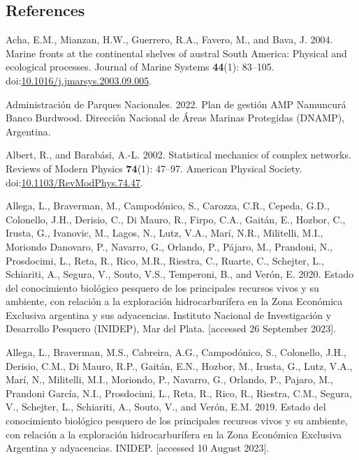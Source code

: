 \documentclass[
]{article}
\newlength{\cslhangindent}
\newenvironment{CSLReferences}[2] %
 {\begin{list}{}{%
  \setlength{\itemindent}{0pt}
  \setlength{\leftmargin}{0pt}
  \setlength{\parsep}{0pt}
  \ifodd #1
   \setlength{\leftmargin}{\cslhangindent}
   \setlength{\itemindent}{-1\cslhangindent}
  \fi
  \setlength{\itemsep}{#2\baselineskip}}}
 {\end{list}}
\begin{document}
\subsection*{References}\label{references}

\label{refs}
\begin{CSLReferences}{1}{0}
Acha, E.M., Mianzan, H.W., Guerrero, R.A., Favero, M., and Bava, J.
2004. Marine fronts at the continental shelves of austral {South
America}: {Physical} and ecological processes. Journal of Marine Systems
\textbf{44}(1): 83--105.
doi:\href{https://doi.org/10.1016/j.jmarsys.2003.09.005}{10.1016/j.jmarsys.2003.09.005}.

Administración de Parques Nacionales. 2022. {Plan de gesti{ó}n AMP
Namuncur{á} Banco Burdwood}. Direcci{ó}n Nacional de {Á}reas Marinas
Protegidas (DNAMP), Argentina.

Albert, R., and Barabási, A.-L. 2002. Statistical mechanics of complex
networks. Reviews of Modern Physics \textbf{74}(1): 47--97. American
Physical Society.
doi:\href{https://doi.org/10.1103/RevModPhys.74.47}{10.1103/RevModPhys.74.47}.

Allega, L., Braverman, M., Campodónico, S., Carozza, C.R., Cepeda, G.D.,
Colonello, J.H., Derisio, C., Di Mauro, R., Firpo, C.A., Gaitán, E.,
Hozbor, C., Irusta, G., Ivanovic, M., Lagos, N., Lutz, V.A., Marí, N.R.,
Militelli, M.I., Moriondo Danovaro, P., Navarro, G., Orlando, P.,
Pájaro, M., Prandoni, N., Prosdocimi, L., Reta, R., Rico, M.R., Riestra,
C., Ruarte, C., Schejter, L., Schiariti, A., Segura, V., Souto, V.S.,
Temperoni, B., and Verón, E. 2020. {Estado del conocimiento biol{ó}gico
pesquero de los principales recursos vivos y su ambiente, con relaci{ó}n
a la exploraci{ó}n hidrocarbur{í}fera en la Zona Econ{ó}mica Exclusiva
argentina y sus adyacencias}. Instituto Nacional de Investigaci{ó}n y
Desarrollo Pesquero (INIDEP), Mar del Plata. {[}accessed 26 September
2023{]}.

Allega, L., Braverman, M.S., Cabreira, A.G., Campodónico, S., Colonello,
J.H., Derisio, C.M., Di Mauro, R.P., Gaitán, E.N., Hozbor, M., Irusta,
G., Lutz, V.A., Marí, N., Militelli, M.I., Moriondo, P., Navarro, G.,
Orlando, P., Pajaro, M., Prandoni García, N.I., Prosdocimi, L., Reta,
R., Rico, R., Riestra, C.M., Segura, V., Schejter, L., Schiariti, A.,
Souto, V., and Verón, E.M. 2019. {Estado del conocimiento biol{ó}gico
pesquero de los principales recursos vivos y su ambiente, con relaci{ó}n
a la exploraci{ó}n hidrocarbur{í}fera en la Zona Econ{ó}mica Exclusiva
Argentina y adyacencias}. INIDEP. {[}accessed 10 August 2023{]}.


\end{CSLReferences}
\end{document}

